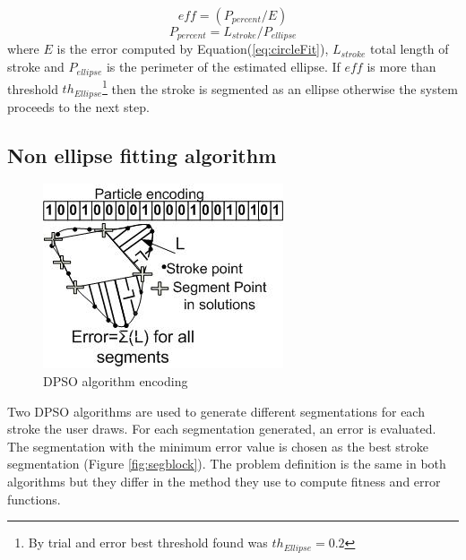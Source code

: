 \documentclass[10pt]{article}
\begin{document}
 \begin{equation}
eff= (P_{percent}/E)
\label{eq:circleError}
\end{equation}
 \begin{equation}
P_{percent}  = L_{stroke} /P_{ellipse} 
\label{eq:ErrorArea}
\end{equation}
where $E$ is the error computed by Equation(\ref{eq:circleFit}), $L_{stroke}$ total length of stroke and $P_{ellipse} $ is the perimeter of the estimated ellipse. If $eff$ is more than threshold $th_{Ellipse}$\footnote{By trial and error best threshold found was $th_{Ellipse}=0.2$} then the stroke is segmented as an ellipse otherwise the system proceeds to the next step. 

\subsection{Non ellipse fitting algorithm}
\label{subsubsec:Discreteparticleswarmalgorithm}
\begin{figure}
	\centering
	 \includegraphics[scale=0.7]{pso1.jpg}			
	\caption{DPSO algorithm encoding}%
	\label{fig:pso1}
\end{figure}
Two DPSO algorithms are used to generate different segmentations for each stroke the user draws. For each segmentation generated, an error is evaluated. The segmentation with the minimum error value is chosen as the best stroke segmentation (Figure \ref{fig:segblock}). The problem definition is the same in both algorithms but they differ in the method they use to compute fitness and error functions. 
\end{document}
